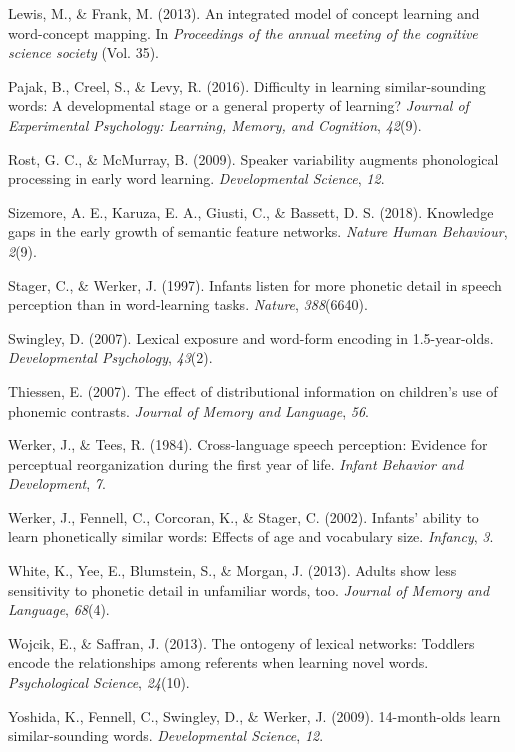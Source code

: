 \documentclass[10pt, letterpaper]{article}
\begin{document}
\hypertarget{ref-lewis2013}{}
Lewis, M., \& Frank, M. (2013). An integrated model of concept learning
and word-concept mapping. In \emph{Proceedings of the annual meeting of
the cognitive science society} (Vol. 35).

\hypertarget{ref-pajak2016}{}
Pajak, B., Creel, S., \& Levy, R. (2016). Difficulty in learning
similar-sounding words: A developmental stage or a general property of
learning? \emph{Journal of Experimental Psychology: Learning, Memory,
and Cognition}, \emph{42}(9).

\hypertarget{ref-rost2009}{}
Rost, G. C., \& McMurray, B. (2009). Speaker variability augments
phonological processing in early word learning. \emph{Developmental
Science}, \emph{12}.

\hypertarget{ref-sizemore2018}{}
Sizemore, A. E., Karuza, E. A., Giusti, C., \& Bassett, D. S. (2018).
Knowledge gaps in the early growth of semantic feature networks.
\emph{Nature Human Behaviour}, \emph{2}(9).

\hypertarget{ref-stager1997}{}
Stager, C., \& Werker, J. (1997). Infants listen for more phonetic
detail in speech perception than in word-learning tasks. \emph{Nature},
\emph{388}(6640).

\hypertarget{ref-swingley2007}{}
Swingley, D. (2007). Lexical exposure and word-form encoding in
1.5-year-olds. \emph{Developmental Psychology}, \emph{43}(2).

\hypertarget{ref-thiessen2007}{}
Thiessen, E. (2007). The effect of distributional information on
children's use of phonemic contrasts. \emph{Journal of Memory and
Language}, \emph{56}.

\hypertarget{ref-werker1984}{}
Werker, J., \& Tees, R. (1984). Cross-language speech perception:
Evidence for perceptual reorganization during the first year of life.
\emph{Infant Behavior and Development}, \emph{7}.

\hypertarget{ref-werker2002}{}
Werker, J., Fennell, C., Corcoran, K., \& Stager, C. (2002). Infants'
ability to learn phonetically similar words: Effects of age and
vocabulary size. \emph{Infancy}, \emph{3}.

\hypertarget{ref-white2013}{}
White, K., Yee, E., Blumstein, S., \& Morgan, J. (2013). Adults show
less sensitivity to phonetic detail in unfamiliar words, too.
\emph{Journal of Memory and Language}, \emph{68}(4).

\hypertarget{ref-wojcik2013}{}
Wojcik, E., \& Saffran, J. (2013). The ontogeny of lexical networks:
Toddlers encode the relationships among referents when learning novel
words. \emph{Psychological Science}, \emph{24}(10).

\hypertarget{ref-yoshida2009}{}
Yoshida, K., Fennell, C., Swingley, D., \& Werker, J. (2009).
14-month-olds learn similar-sounding words. \emph{Developmental
Science}, \emph{12}.
\end{document}
